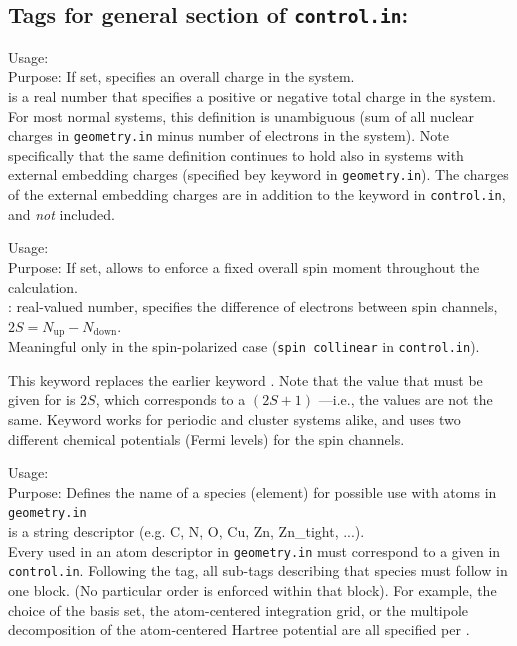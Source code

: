 \newpage

\subsection*{Tags for general section of \texttt{control.in}:}

{
 \noindent
 Usage:   \\[1.0ex]
 Purpose: If set, specifies an overall charge in the system. \\[1.0ex]
  is a real number that specifies a positive or negative total
   charge in the system. \\
}
For most normal systems, this definition is unambiguous (sum of all nuclear
charges in \texttt{geometry.in} minus number of electrons in the system). Note
specifically that the same definition continues to hold also in systems with
external embedding charges (specified bey keyword  in
\texttt{geometry.in}). The charges of the external embedding charges are in
addition to the  keyword in \texttt{control.in}, and
\emph{not} included.

{
 \noindent
 Usage:   \\[1.0ex]
 Purpose: If set, allows to enforce a fixed overall spin moment throughout the calculation. \\[1.0ex]
   : real-valued number, specifies the difference of electrons
  between spin channels, $2S = N_\text{up}-N_\text{down}$. \\ 
} 
Meaningful only in the spin-polarized case (\texttt{spin collinear} in
\texttt{control.in}). 

This keyword replaces the earlier keyword
. Note that the value that must be given for
 is $2S$, which corresponds to a
 $(2S+1)$ ---i.e., the values are not the same.
Keyword  works for periodic and cluster
systems alike, and uses two different chemical potentials (Fermi
levels) for the spin channels.

{
  \noindent
  Usage:   \\[1.0ex]
  Purpose: Defines the name of a species (element) for possible use with atoms
    in \texttt{geometry.in}\\[1.0ex] 
   is a string descriptor (e.g. C, N, O, Cu, Zn,
    Zn\_tight, ...). \\
}
Every  used in an atom descriptor in
\texttt{geometry.in} must correspond to a 
given in \texttt{control.in}. Following the  tag, all
sub-tags describing that species must follow in one block. (No particular
order is enforced within that block). For example, the choice of the basis
set, the atom-centered integration grid, or the multipole decomposition of
the atom-centered Hartree potential are all specified per . 

